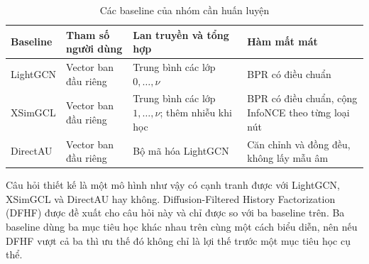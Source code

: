 \begin{table}[H]
\centering
\small
\renewcommand{\arraystretch}{1.1}
\begin{tabularx}{\textwidth}{@{}p{2.4cm}>{\raggedright\arraybackslash}X>{\raggedright\arraybackslash}X>{\raggedright\arraybackslash}X@{}}
\toprule
Baseline & Tham số người dùng & Lan truyền và tổng hợp & Hàm mất mát \\
\midrule
LightGCN & Vector ban đầu riêng & Trung bình các lớp $0,\ldots,\nu$ & BPR có điều chuẩn \\
XSimGCL & Vector ban đầu riêng & Trung bình các lớp $1,\ldots,\nu$; thêm nhiễu khi học & BPR có điều chuẩn, cộng InfoNCE theo từng loại nút \\
DirectAU & Vector ban đầu riêng & Bộ mã hóa LightGCN & Căn chỉnh và đồng đều, không lấy mẫu âm \\
\bottomrule
\end{tabularx}
\caption{Các baseline của nhóm cần huấn luyện}
\label{tab:trained-family}
\end{table}

Câu hỏi thiết kế là một mô hình như vậy có cạnh tranh được với LightGCN, XSimGCL và DirectAU hay không. Diffusion-Filtered History Factorization (DFHF) được đề xuất cho câu hỏi này và chỉ được so với ba baseline trên. Ba baseline dùng ba mục tiêu học khác nhau trên cùng một cách biểu diễn, nên nếu DFHF vượt cả ba thì ưu thế đó không chỉ là lợi thế trước một mục tiêu học cụ thể.
